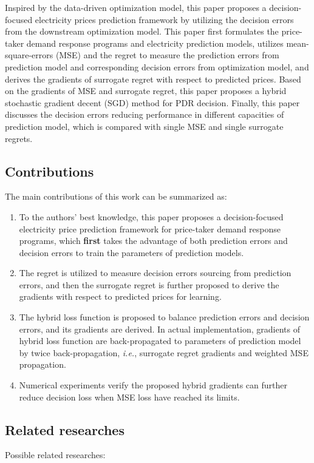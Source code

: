 \documentclass[journal]{IEEEtran}
\begin{document}
Inspired by the data-driven optimization model, this paper proposes a decision-focused electricity prices prediction framework by utilizing the decision errors from the downstream optimization model. This paper first formulates the price-taker demand response programs and electricity prediction models, utilizes mean-square-errors (MSE) and the regret to measure the prediction errors from prediction model and corresponding decision errors from optimization model, and derives the gradients of surrogate regret with respect to predicted prices. Based on the gradients of MSE and surrogate regret, this paper proposes a hybrid stochastic gradient decent (SGD) method for PDR decision. Finally, this paper discusses the decision errors reducing performance in different capacities of prediction model, which is compared with single MSE and single surrogate regrets. 

\subsection{Contributions}
The main contributions of this work can be summarized as:
\begin{enumerate}[\IEEEsetlabelwidth{12)}]
  \item To the authors' best knowledge, this paper proposes a decision-focused electricity price prediction framework for price-taker demand response programs, which \textbf{first} takes the advantage of both prediction errors and decision errors to train the parameters of prediction models.
  \item The regret is utilized to measure decision errors sourcing from prediction errors, and then the surrogate regret is further proposed to derive the gradients with respect to predicted prices for learning.
  \item The hybrid loss function is proposed to balance prediction errors and decision errors, and its gradients are derived. In actual implementation, gradients of hybrid loss function are back-propagated to parameters of prediction model by twice back-propagation, \textit{i.e.}, surrogate regret gradients and weighted MSE propagation.
  \item Numerical experiments verify the proposed hybrid gradients can further reduce decision loss when MSE loss have reached its limits.
\end{enumerate}

\subsection{Related researches}
Possible related researches:
\end{document}
